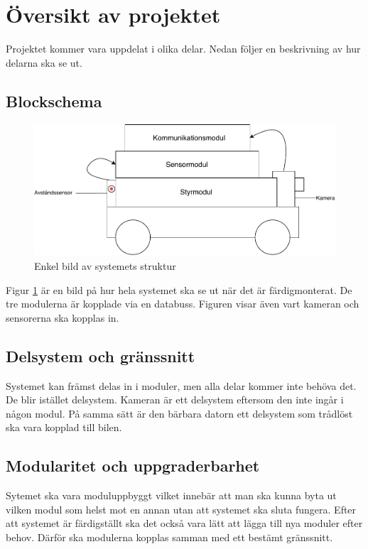 \documentclass[systemskiss/skiss.tex]{subfiles}
\begin{document}
\section{Översikt av projektet}
Projektet kommer vara uppdelat i olika delar. Nedan följer en beskrivning av hur delarna ska se ut.
\subsection{Blockschema}
\begin{figure}[h]
    \centering
    \includegraphics[width=0.6\linewidth]{systemskiss/figures/taxibilen.pdf}
    \caption{Enkel bild av systemets struktur}
    \label{fig:taxiskiss}
\end{figure}

Figur \ref{fig:taxiskiss} är en bild på hur hela systemet ska se ut när det är färdigmonterat. De tre modulerna är kopplade via en databuss. Figuren visar även vart kameran och sensorerna ska kopplas in. 
\subsection{Delsystem och gränssnitt}
Systemet kan främst delas in i moduler, men alla delar kommer inte behöva det. De blir istället delsystem. Kameran är ett delsystem eftersom den inte ingår i någon modul. På samma sätt är den bärbara datorn ett delsystem som trådlöst ska vara kopplad till bilen. 

\subsection{Modularitet och uppgraderbarhet}
Sytemet ska vara moduluppbyggt vilket innebär att man ska kunna byta ut vilken modul som helst mot en annan utan att systemet ska sluta fungera. Efter att systemet är färdigställt ska det också vara lätt att lägga till nya moduler efter behov. Därför ska modulerna kopplas samman med ett bestämt gränssnitt. 
\end{document}
